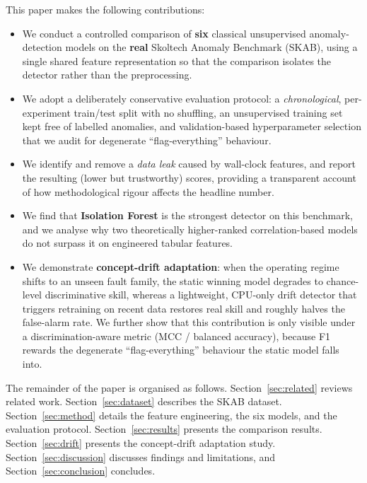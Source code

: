 \documentclass[conference]{IEEEtran}
\begin{document}
This paper makes the following contributions:
\begin{itemize}
\item We conduct a controlled comparison of \textbf{six} classical unsupervised
anomaly-detection models on the \textbf{real} Skoltech Anomaly Benchmark (SKAB),
using a single shared feature representation so that the comparison isolates the
detector rather than the preprocessing.
\item We adopt a deliberately conservative evaluation protocol: a
\emph{chronological}, per-experiment train/test split with no shuffling, an
unsupervised training set kept free of labelled anomalies, and validation-based
hyperparameter selection that we audit for degenerate ``flag-everything''
behaviour.
\item We identify and remove a \emph{data leak} caused by wall-clock features,
and report the resulting (lower but trustworthy) scores, providing a transparent
account of how methodological rigour affects the headline number.
\item We find that \textbf{Isolation Forest} is the strongest detector on this
benchmark, and we analyse why two theoretically higher-ranked correlation-based
models do not surpass it on engineered tabular features.
\item We demonstrate \textbf{concept-drift adaptation}: when the operating
regime shifts to an unseen fault family, the static winning model degrades to
chance-level discriminative skill, whereas a lightweight, CPU-only drift detector
that triggers retraining on recent data restores real skill and roughly halves
the false-alarm rate. We further show that this contribution is only visible
under a discrimination-aware metric (MCC / balanced accuracy), because F1 rewards
the degenerate ``flag-everything'' behaviour the static model falls into.
\end{itemize}

The remainder of the paper is organised as follows. Section~\ref{sec:related}
reviews related work. Section~\ref{sec:dataset} describes the SKAB dataset.
Section~\ref{sec:method} details the feature engineering, the six models, and
the evaluation protocol. Section~\ref{sec:results} presents the comparison
results. Section~\ref{sec:drift} presents the concept-drift adaptation study.
Section~\ref{sec:discussion} discusses findings and limitations, and
Section~\ref{sec:conclusion} concludes.
\end{document}
